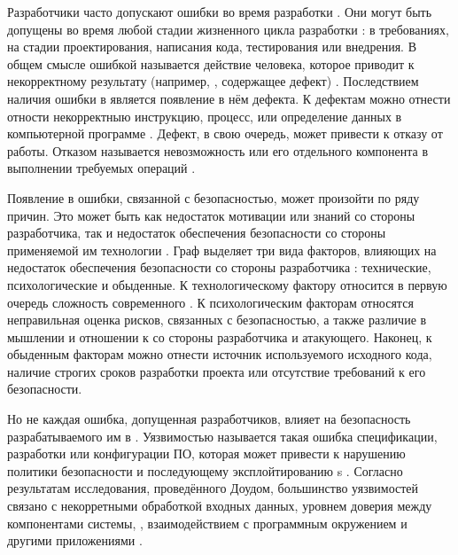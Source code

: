 \Sentence
Разработчики часто допускают ошибки во время разработки . 
\Sentence
Они могут быть допущены во время любой стадии жизненного цикла разработки : 
в требованиях, на стадии проектирования, написания кода, тестирования или внедрения. 
\Sentence
В общем смысле ошибкой называется действие человека, которое приводит к некорректному результату 
(например, , содержащее дефект) . 
\Sentence
Последствием наличия ошибки в  является появление в нём дефекта. 
\Sentence
К дефектам можно отнести отности некорректныю инструкцию, процесс, или определение данных 
в компьютерной программе . 
\Sentence
Дефект, в свою очередь, может привести к отказу  от работы. 
\Sentence
Отказом называется невозможность  или его отдельного компонента 
в выполнении требуемых операций .

\Sentence
Появление в  ошибки, связанной с безопасностью, может произойти по ряду 
причин. 
\Sentence
Это может быть как недостаток мотивации или знаний со стороны разработчика, так и 
недостаток обеспечения безопасности со стороны применяемой им технологии . 
\Sentence
Граф выделяет три вида факторов, влияющих на недостаток обеспечения безопасности со стороны 
разработчика : технические, психологические и обыденные. 
\Sentence
К технологическому фактору относится в первую очередь сложность современного 
. 
\Sentence
К психологическим факторам относятся неправильная оценка рисков, связанных с безопасностью, а также 
различие в мышлении и отношении к  со стороны разработчика и атакующего. 
\Sentence
Наконец, к обыденным факторам можно отнести источник используемого исходного кода, наличие строгих 
сроков разработки проекта или отсутствие требований к его безопасности.

\Sentence
Но не каждая ошибка, допущенная разработчиков, влияет на безопасность разрабатываемого им в 
. 
\Sentence
Уязвимостью называется такая ошибка спецификации, разработки или конфигурации ПО, которая может 
привести к нарушению политики безопасности и последующему эксплойтированию  s
   .
\Sentence
Согласно результатам исследования, проведённого Доудом, большинство уязвимостей связано с 
некорретными обработкой входных данных, уровнем доверия между компонентами системы, 
, взаимодействием с программным окружением и другими приложениями 
. 
